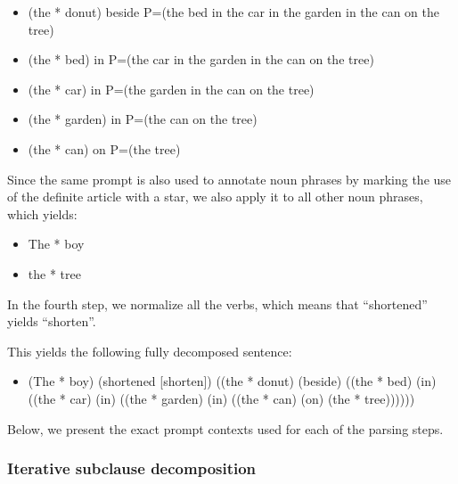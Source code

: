 \documentclass{article} \usepackage{iclr2022_conference,times}
\newcommand{\example}[1]{\begin{itemize} #1 \end{itemize}}
\newcommand{\ex}{\item}
\begin{document}
\example{
\ex (the * donut) beside P=(the bed in the car in the garden in the can on the tree)
\ex (the * bed) in P=(the car in the garden in the can on the tree)
\ex (the * car) in P=(the garden in the can on the tree)
\ex (the * garden) in P=(the can on the tree)
\ex (the * can) on P=(the tree)
}

Since the same prompt is also used to annotate noun phrases by marking the use of the definite article with a star, we also apply it to all other noun phrases, which yields:

\example{
\ex The * boy
\ex the * tree
}

In the fourth step, we normalize all the verbs, which means that ``shortened'' yields ``shorten''.

This yields the following fully decomposed sentence:

\example{\ex (The * boy) (shortened [shorten]) ((the * donut) (beside) ((the * bed) (in) ((the * car) (in) ((the * garden) (in) ((the * can) (on) (the * tree))))))}

Below, we present the exact prompt contexts used for each of the parsing steps.

\subsubsection{Iterative subclause decomposition}
\end{document}

